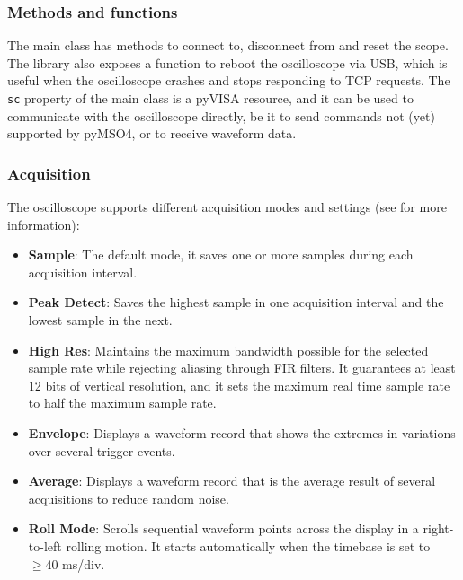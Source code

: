 \documentclass[a4paper,english,twoside,10pt]{article}
\begin{document}
\subsubsection{Methods and functions}
The main class has methods to connect to, disconnect from and reset the scope. The library also exposes a function to reboot the oscilloscope via USB, which is useful when the oscilloscope crashes and stops responding to TCP requests. The \texttt{sc} property of the main class is a pyVISA resource, and it can be used to communicate with the oscilloscope directly, be it to send commands not (yet) supported by pyMSO4, or to receive waveform data.

\subsubsection{Acquisition}
The oscilloscope supports different acquisition modes and settings (see \cite[p.~180]{tektronix:mso-help} for more information):
\begin{itemize}
	\item \textbf{Sample}: The default mode, it saves one or more samples during each acquisition interval.
	\item \textbf{Peak Detect}: Saves the highest sample in one acquisition interval and the lowest sample in the next.
	\item \textbf{High Res}: Maintains the maximum bandwidth possible for the selected sample rate while rejecting aliasing through FIR filters. It guarantees at least 12 bits of vertical resolution, and it sets the maximum real time sample rate to half the maximum sample rate.
	\item \textbf{Envelope}: Displays a waveform record that shows the extremes in variations over several trigger events.
	\item \textbf{Average}: Displays a waveform record that is the average result of several acquisitions to reduce random noise.
	\item \textbf{Roll Mode}: Scrolls sequential waveform points across the display in a right-to-left rolling motion. It starts automatically when the timebase is set to \( \geq 40 \) ms/div.
\end{itemize}
\end{document}

